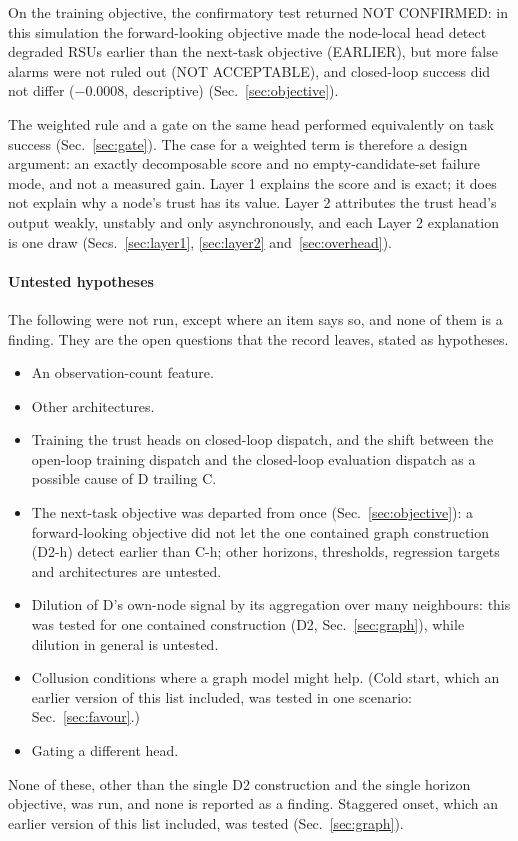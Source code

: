 On the training objective, the confirmatory test returned NOT CONFIRMED: in this simulation the forward-looking objective made the node-local head detect degraded RSUs earlier than the next-task objective (EARLIER), but more false alarms were not ruled out (NOT ACCEPTABLE), and closed-loop success did not differ ($-0.0008$, descriptive) (Sec.~\ref{sec:objective}).
\latcaveat

The weighted rule and a gate on the same head performed equivalently on task success (Sec.~\ref{sec:gate}).
The case for a weighted term is therefore a design argument: an exactly decomposable score and no empty-candidate-set failure mode, and not a measured gain.
Layer 1 explains the score and is exact; it does not explain why a node's trust has its value.
Layer 2 attributes the trust head's output weakly, unstably and only asynchronously, and each Layer 2 explanation is one draw (Secs.~\ref{sec:layer1}, \ref{sec:layer2} and~\ref{sec:overhead}).

\paragraph*{Untested hypotheses}
The following were not run, except where an item says so, and none of them is a finding.
They are the open questions that the record leaves, stated as hypotheses.
\begin{itemize}
\item An observation-count feature.
\item Other architectures.
\item Training the trust heads on closed-loop dispatch, and the shift between the open-loop training dispatch and the closed-loop evaluation dispatch as a possible cause of D trailing C.
\item The next-task objective was departed from once (Sec.~\ref{sec:objective}): a forward-looking objective did not let the one contained graph construction (D2-h) detect earlier than C-h; other horizons, thresholds, regression targets and architectures are untested.
\item Dilution of D's own-node signal by its aggregation over many neighbours: this was tested for one contained construction (D2, Sec.~\ref{sec:graph}), while dilution in general is untested.
\item Collusion conditions where a graph model might help. (Cold start, which an earlier version of this list included, was tested in one scenario: Sec.~\ref{sec:favour}.)
\item Gating a different head.
\end{itemize}
None of these, other than the single D2 construction and the single horizon objective, was run, and none is reported as a finding.
Staggered onset, which an earlier version of this list included, was tested (Sec.~\ref{sec:graph}).
